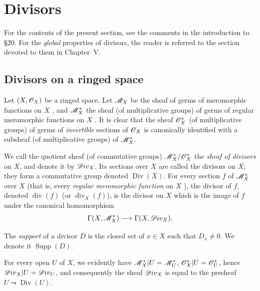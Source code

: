 \section{Divisors}
\label{section:IV.21}

For the contents of the present section, see the comments in the introduction to §20.
For the \emph{global} properties of divisors, the reader is referred to the section devoted to them in Chapter~V.

\subsection{Divisors on a ringed space}
\label{subsection:IV.21.1}
\label{IV.21.1}

\begin{env}[21.1.1]
\label{IV.21.1.1}
Let $(X,\mathscr{O}_X)$ be a ringed space.
Let $\mathscr{M}_X$ be the sheaf of germs of meromorphic functions on $X$ , and $\mathscr{M}_X^*$ the sheaf (of multiplicative groups) of germs of regular meromorphic functions on $X$ .
It is clear that the sheaf $\mathscr{O}_X^*$ (of multiplicative groups) of germs of \emph{invertible} sections of $\mathscr{O}_X$ is canonically identified with a subsheaf (of multiplicative groups) of $\mathscr{M}_X^*$.
\end{env}

\begin{definition}[21.1.2]
\label{IV.21.1.2}
We call the quotient sheaf (of commutative groups) $\mathscr{M}_X^*/\mathscr{O}_X^*$ the \emph{sheaf of divisors} on $X$, and denote it by $\mathscr{D}iv_X$.
Its sections over $X$ are called the divisors on $X$; they form a commutative group denoted $\operatorname{Div}(X)$.
For every section $f$ of $\mathscr{M}_X^*$ over $X$ \textup{(that is, every \emph{regular meromorphic function} on $X$ )}, the divisor of $f$, denoted $\operatorname{div}(f)$ \textup{(or $\operatorname{div}_X(f)$)}, is the divisor on $X$ which is the image of $f$ under the canonical homomorphism
\[
  \Gamma(X,\mathscr{M}_X^*)\longrightarrow\Gamma(X,\mathscr{D}iv_X).
\]
\end{definition}


The \emph{support} of a divisor $D$ is the closed set of $x\in X$ such that $D_x\neq 0$.
We denote it $\operatorname{Supp}(D)$.

For every open $U$ of $X$, we evidently have $\mathscr{M}_X^*|U=\mathscr{M}_U^*$, $\mathscr{O}_X^*|U=\mathscr{O}_U^*$, hence
$\mathscr{D}iv_X|U=\mathscr{D}iv_U$, and consequently the sheaf $\mathscr{D}iv_X$ is equal to the presheaf $U\leadsto\operatorname{Div}(U)$.

